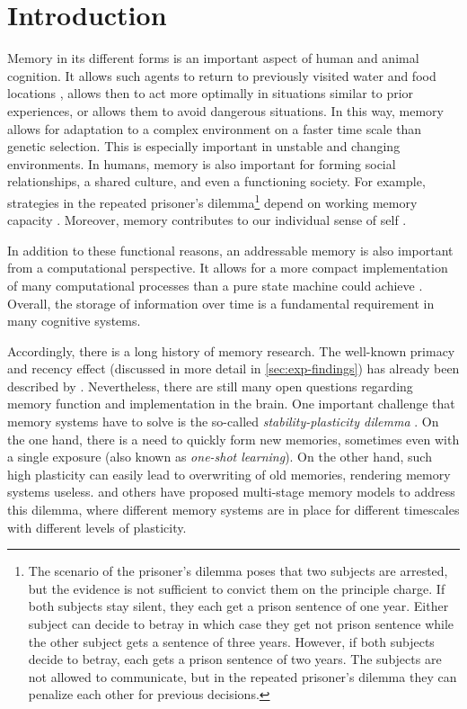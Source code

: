 \chapter{Introduction}

Memory in its different forms is an important aspect of human and animal cognition.
It allows such agents to return to previously visited water and food locations \parencite{vorhees2014}, allows then to act more optimally in situations similar to prior experiences, or allows them to avoid dangerous situations.
In this way, memory allows for adaptation to a complex environment on a faster time scale than genetic selection.
This is especially important in unstable and changing environments.
In humans, memory is also important for forming social relationships, a shared culture, and even a functioning society.
For example, strategies in the repeated prisoner's
dilemma\footnote{The scenario of the prisoner's dilemma poses that two subjects are arrested, but the evidence is not sufficient to convict them on the principle charge. If both subjects stay silent, they each get a prison sentence of one year. Either subject can decide to betray in which case they get not prison sentence while the other subject gets a sentence of three years. However, if both subjects decide to betray, each gets a prison sentence of two years. The subjects are not allowed to communicate, but in the repeated prisoner's dilemma they can penalize each other for previous decisions.} depend on working memory capacity \parencite{milinski1998}.
Moreover, memory contributes to our individual sense of self \parencite{prebble2013}.

In addition to these functional reasons, an addressable memory is also important from a computational perspective.
It allows for a more compact implementation of many computational processes than a pure state machine could achieve \parencite{gallistel2009}.
Overall, the storage of information over time is a fundamental requirement in many cognitive systems.

Accordingly, there is a long history of memory research.
The well-known primacy and recency effect (discussed in more detail in \cref{sec:exp-findings}) has already been described by \textcite{Robinson1926}.
Nevertheless, there are still many open questions regarding memory function and implementation in the brain.
One important challenge that memory systems have to solve is the so-called \emph{stability-plasticity dilemma} \parencite{Abraham2005}.
On the one hand, there is a need to quickly form new memories, sometimes even with a single exposure (also known as \emph{one-shot learning}).
On the other hand, such high plasticity can easily lead to overwriting of old memories, rendering memory systems useless.
\Textcite{Buzsaki1989} and others have proposed multi-stage memory models to address this dilemma, where different memory systems are in place for different timescales with different levels of plasticity.

